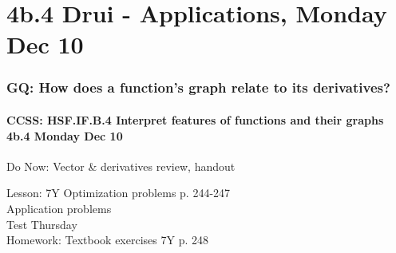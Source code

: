 \documentclass{beamer}
\begin{document}
\section{4b.4 Drui - Applications, Monday Dec 10}
  \frame
  {\frametitle{GQ: How does a function's graph relate to its derivatives?}
    \framesubtitle{CCSS: HSF.IF.B.4 Interpret features of functions and their graphs \quad \alert{4b.4 Monday Dec 10}}

    \begin{block}{Do Now:  Vector \& derivatives review, handout}
    \end{block}
    Lesson: 7Y Optimization problems p. 244-247\\
    Application problems\\ \bigskip
    \alert{Test Thursday} \\[0.5cm]
    Homework: Textbook exercises 7Y p. 248
  }
\end{document}
